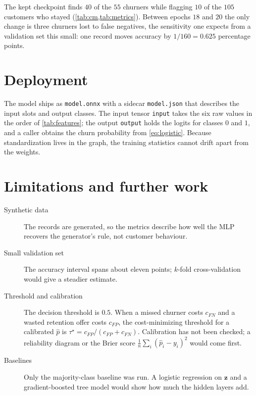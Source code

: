\documentclass[11pt]{article}
\newcommand{\code}[1]{\texttt{#1}}
\begin{document}
The kept checkpoint finds $40$ of the $55$ churners while flagging $10$ of the
$105$ customers who stayed (\cref{tab:cm,tab:metrics}). Between epochs $18$ and
$20$ the only change is three churners lost to false negatives, the
sensitivity one expects from a validation set this small: one record moves
accuracy by $1/160 = 0.625$ percentage points.

\section{Deployment}\label{sec:deploy}

The model ships as \code{model.onnx} with a sidecar \code{model.json} that
describes the input slots and output classes. The input tensor \code{input}
takes the six raw values in the order of \cref{tab:features}; the output
\code{output} holds the logits for classes $0$ and $1$, and a caller obtains the
churn probability from \cref{eq:logistic}. Because standardization lives in the
graph, the training statistics cannot drift apart from the weights.

\section{Limitations and further work}\label{sec:limits}

\begin{description}
  \item[Synthetic data] The records are generated, so the metrics describe how
        well the MLP recovers the generator's rule, not customer behaviour.
  \item[Small validation set] The accuracy interval spans about eleven points;
        $k$-fold cross-validation would give a steadier estimate.
  \item[Threshold and calibration] The decision threshold is $0.5$. When a
        missed churner costs $c_{FN}$ and a wasted retention offer costs
        $c_{FP}$, the cost-minimizing threshold for a calibrated $\hat{p}$ is
        $\tau^\star = c_{FP}/(c_{FP} + c_{FN})$. Calibration has not been
        checked; a reliability diagram or the Brier score
        $\frac{1}{n}\sum_i (\hat{p}_i - y_i)^2$ would come first.
  \item[Baselines] Only the majority-class baseline was run. A logistic
        regression on $\bm{z}$ and a gradient-boosted tree model would show
        how much the hidden layers add.
\end{description}
\end{document}
